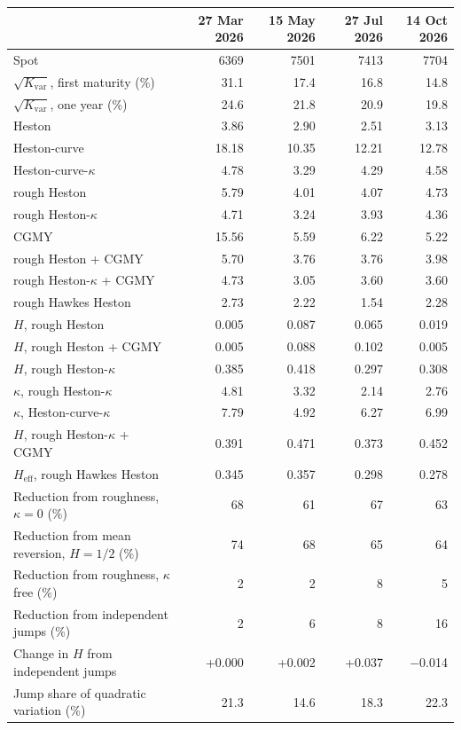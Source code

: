 \begin{tabular}{lrrrr}
\toprule
  & 27 Mar 2026 & 15 May 2026 & 27 Jul 2026 & 14 Oct 2026\\
\midrule
Spot & 6369 & 7501 & 7413 & 7704\\
$\sqrt{K_{\mathrm{var}}}$, first maturity (\%) & 31.1 & 17.4 & 16.8 & 14.8\\
$\sqrt{K_{\mathrm{var}}}$, one year (\%) & 24.6 & 21.8 & 20.9 & 19.8\\
\midrule
Heston & 3.86 & 2.90 & 2.51 & 3.13\\
Heston-curve & 18.18 & 10.35 & 12.21 & 12.78\\
Heston-curve-$\kappa$ & 4.78 & 3.29 & 4.29 & 4.58\\
rough Heston & 5.79 & 4.01 & 4.07 & 4.73\\
rough Heston-$\kappa$ & 4.71 & 3.24 & 3.93 & 4.36\\
CGMY & 15.56 & 5.59 & 6.22 & 5.22\\
rough Heston + CGMY & 5.70 & 3.76 & 3.76 & 3.98\\
rough Heston-$\kappa$ + CGMY & 4.73 & 3.05 & 3.60 & 3.60\\
rough Hawkes Heston & 2.73 & 2.22 & 1.54 & 2.28\\
\midrule
$H$, rough Heston & 0.005 & 0.087 & 0.065 & 0.019\\
$H$, rough Heston + CGMY & 0.005 & 0.088 & 0.102 & 0.005\\
$H$, rough Heston-$\kappa$ & 0.385 & 0.418 & 0.297 & 0.308\\
$\kappa$, rough Heston-$\kappa$ & 4.81 & 3.32 & 2.14 & 2.76\\
$\kappa$, Heston-curve-$\kappa$ & 7.79 & 4.92 & 6.27 & 6.99\\
$H$, rough Heston-$\kappa$ + CGMY & 0.391 & 0.471 & 0.373 & 0.452\\
$H_{\mathrm{eff}}$, rough Hawkes Heston & 0.345 & 0.357 & 0.298 & 0.278\\
\midrule
Reduction from roughness, $\kappa = 0$ (\%) & 68 & 61 & 67 & 63\\
Reduction from mean reversion, $H = 1/2$ (\%) & 74 & 68 & 65 & 64\\
Reduction from roughness, $\kappa$ free (\%) & 2 & 2 & 8 & 5\\
Reduction from independent jumps (\%) & 2 & 6 & 8 & 16\\
Change in $H$ from independent jumps & +0.000 & +0.002 & +0.037 & $-$0.014\\
Jump share of quadratic variation (\%) & 21.3 & 14.6 & 18.3 & 22.3\\
\bottomrule
\end{tabular}
